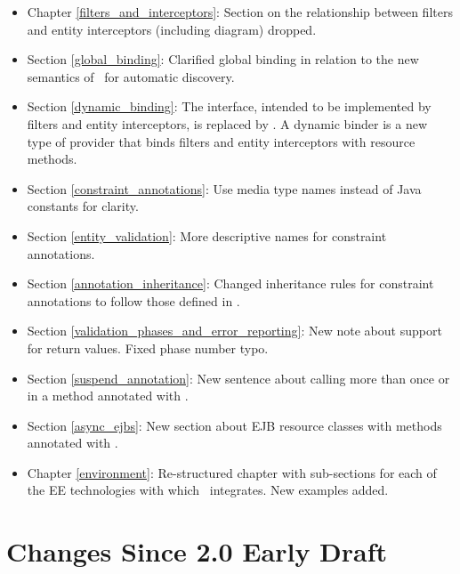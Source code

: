\begin{itemize}
\item Chapter \ref{filters_and_interceptors}: Section on the relationship between filters and entity interceptors (including diagram) dropped.
\item Section \ref{global_binding}: Clarified global binding in relation to the new semantics of \Provider\ for automatic discovery.
\item Section \ref{dynamic_binding}: The  interface, intended to be implemented by filters and entity interceptors, is replaced by . A dynamic binder is a new type of provider that binds filters and entity interceptors with resource methods. 
\item Section \ref{constraint_annotations}: Use media type names instead of Java constants for clarity.
\item Section \ref{entity_validation}: More descriptive names for constraint annotations.
\item Section \ref{annotation_inheritance}: Changed inheritance rules for constraint annotations to follow those defined in \cite{bv11}.
\item Section \ref{validation_phases_and_error_reporting}: New note about  support for return values. Fixed phase number typo.
\item Section \ref{suspend_annotation}: New sentence about calling  more than once or in a method annotated with .
\item Section \ref{async_ejbs}: New section about EJB resource classes with methods annotated with .
\item Chapter \ref{environment}: Re-structured chapter with sub-sections for each of the EE technologies with which \jaxrs\ integrates. New examples added.
\end{itemize}

\section{Changes Since 2.0 Early Draft}

